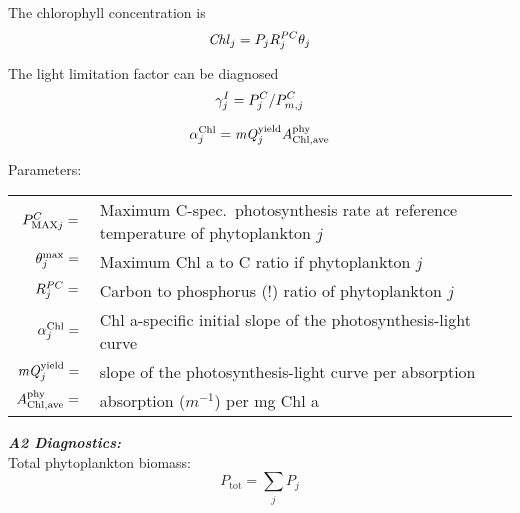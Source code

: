 \documentclass[11pt,letterpaper,english]{article}
\begin{document}
The chlorophyll concentration is
\[
  \mathit{Chl}_j=P_j R^{PC}_j \theta_j
\]

The light limitation factor can be diagnosed
\[
  \gamma^I_j=P^C_j/P^C_{m,j}
\]

\[
  \alpha^{\textrm{Chl}}_j = \mathit{mQ}^{\textrm{yield}}_j A^{\mathrm{phy}}_{\mathrm{Chl,ave}}
\]

Parameters:\\
\begin{tabular}{@{\qquad}r@{}l}
 $P^C_{\textrm{MAX}j}    ={}$& Maximum C-spec.\ photosynthesis rate at reference temperature of phytoplankton $j$\\
 $\theta^{\textrm{max}}_j ={}$& Maximum Chl a to C ratio if phytoplankton $j$\\
 $R^{PC}_j       ={}$& Carbon to phosphorus (!) ratio of phytoplankton $j$\\
 $\alpha^{\textrm{Chl}}_j  ={}$& Chl a-specific initial slope of the photosynthesis-light curve\\
 $\mathit{mQ}^{\textrm{yield}}_j   ={}$& slope of the photosynthesis-light curve per absorption\\
 $A^{\mathrm{phy}}_{\mathrm{Chl,ave}}  ={}$& absorption ($m^{-1}$) per mg Chl a
\end{tabular}



\newcommand{\Ptot}{P_{\mathrm{tot}}}

{\it {\bf A2 Diagnostics:}}\\
Total phytoplankton biomass:
\[
  \Ptot = \sum_j P_j
\]
\end{document}
